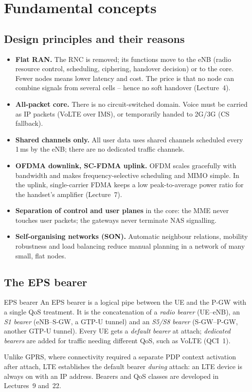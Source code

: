 \documentclass[11pt,a4paper]{article}
\begin{document}
\section{Fundamental concepts}

\subsection{Design principles and their reasons}
\begin{itemize}
  \item \textbf{Flat RAN.} The RNC is removed; its functions move to the eNB (radio resource
        control, scheduling, ciphering, handover decision) or to the core. Fewer nodes means
        lower latency and cost. The price is that no node can combine signals from several
        cells -- hence no soft handover (Lecture~4).
  \item \textbf{All-packet core.} There is no circuit-switched domain. Voice must be carried as
        IP packets (VoLTE over IMS), or temporarily handed to 2G/3G (CS fallback).
  \item \textbf{Shared channels only.} All user data uses shared channels scheduled every 1\,ms
        by the eNB; there are no dedicated traffic channels.
  \item \textbf{OFDMA downlink, SC-FDMA uplink.} OFDM scales gracefully with bandwidth and makes
        frequency-selective scheduling and MIMO simple. In the uplink, single-carrier FDMA keeps
        a low peak-to-average power ratio for the handset's amplifier (Lecture~7).
  \item \textbf{Separation of control and user planes} in the core: the MME never touches user
        packets; the gateways never terminate NAS signalling.
  \item \textbf{Self-organising networks (SON).} Automatic neighbour relations, mobility robustness
        and load balancing reduce manual planning in a network of many small, flat nodes.
\end{itemize}

\subsection{The EPS bearer}
\begin{definitionbox}{EPS bearer}
An EPS bearer is a logical pipe between the UE and the P-GW with a single QoS treatment. It is
the concatenation of a \emph{radio bearer} (UE--eNB), an \emph{S1 bearer} (eNB--S-GW, a GTP-U
tunnel) and an \emph{S5/S8 bearer} (S-GW--P-GW, another GTP-U tunnel). Every UE gets a
\emph{default bearer} at attach; \emph{dedicated bearers} are added for traffic needing
different QoS, such as VoLTE (QCI~1).
\end{definitionbox}
Unlike GPRS, where connectivity required a separate PDP context activation after attach, LTE
establishes the default bearer \emph{during} attach: an LTE device is always on with an IP
address. Bearers and QoS classes are developed in Lectures~9 and~22.
\end{document}
